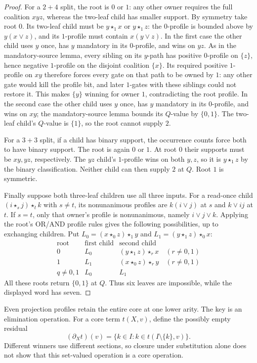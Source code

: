 \begin{proof}
For a $2+4$ split, the root is $0$ or $1$: any other owner requires
the full coalition $xyz$, whereas the two-leaf child has smaller support.
By symmetry take root $0$. Its two-leaf child must be $y\star_1x$
or $y\star_1z$: the $0$-profile is bounded above by $y(x\vee z)$,
and its $1$-profile must contain $x(y\vee z)$.
In the first case the other child uses $y$ once, has $y$ mandatory in
its $0$-profile, and wins on $yz$. As in the mandatory-source lemma,
every sibling on its $y$-path has positive $0$-profile on $\{z\}$,
hence negative $1$-profile on the disjoint coalition $\{x\}$.
Its required positive $1$-profile on $xy$ therefore forces every gate
on that path to be owned by $1$: any other gate would kill the profile
bit, and later $1$-gates with these siblings could not restore it.
This makes $\{y\}$ winning for owner $1$, contradicting the root profile.
In the second case the other child uses $y$ once, has $y$ mandatory in
its $0$-profile, and wins on $xy$; the mandatory-source lemma bounds
its $Q$-value by $\{0,1\}$. The two-leaf child's $Q$-value is $\{1\}$,
so the root cannot supply $2$.

For a $3+3$ split, if a child has binary support, the occurrence counts
force both to have binary support. The root is again $0$ or $1$.
At root $0$ their supports must be $xy,yz$, respectively. The $yz$
child's $1$-profile wins on both $y,z$, so it is $y\star_1z$ by the
binary classification. Neither child can then supply $2$ at $Q$.
Root $1$ is symmetric.

Finally suppose both three-leaf children use all three inputs.
For a read-once child $(i\star_sj)\star_tk$ with $s\ne t$, its
nonunanimous profiles are $k(i\vee j)$ at $s$ and $k\vee ij$ at $t$.
If $s=t$, only that owner's profile is nonunanimous, namely $i\vee j\vee k$.
Applying the root's OR/AND profile rules gives the following possibilities,
up to exchanging children. Put
$L_0=(x\star_0z)\star_1y$ and $L_1=(y\star_1z)\star_0x$:
\[
\begin{array}{c|c|c}
 \text{root}&\text{first child}&\text{second child}\\\hline
 0&L_0&(y\star_1z)\star_rx\quad(r\ne0,1)\\
 1&L_1&(x\star_0z)\star_ry\quad(r\ne0,1)\\
 q\ne0,1&L_0&L_1
\end{array}
\]
All these roots return $\{0,1\}$ at $Q$. Thus six leaves are impossible,
while the displayed word has seven.
\end{proof}

Even projection profiles retain the entire core at one lower arity.
The key is an elimination operation. For a core term $t(X,v)$, define
the possibly empty residual
\[
 (\partial_Xt)(v)=\{k\in I:k\in t(I\setminus\{k\},v)\}.
\]
Different winners use different sections, so closure under substitution
alone does not show that this set-valued operation is a core operation.

